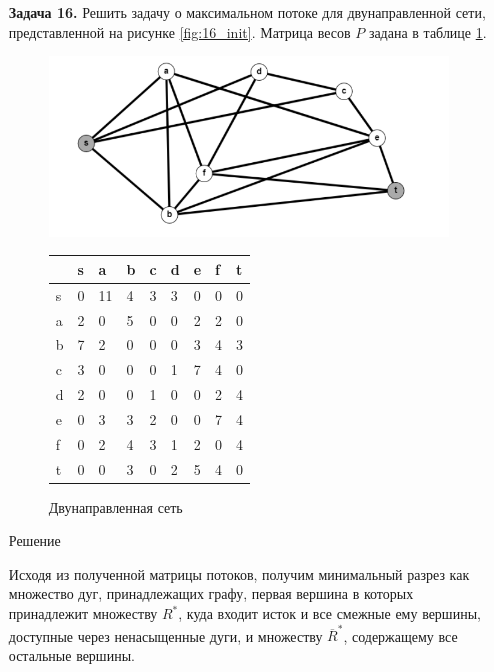 \documentclass{article}
\begin{document}
\clearpage%
\begin{enumerate} 
\item[\textbf{Задача 16.}]  Решить задачу о максимальном потоке для двунаправленной сети, представленной на рисунке \ref{fig:16_init}. Матрица весов $P$ задана в таблице \ref{tab:16_table}.
\begin{figure}[ht]
  \begin{minipage}[b]{.5\linewidth}
    \centering
    \includegraphics[width=\textwidth, center]{attachments/16/0.png}
    \caption{Двунаправленная сеть}
    \label{fig:16_init}
  \end{minipage}
  \hfill
  \begin{minipage}[b]{.45\linewidth}
    \centering
    \begin{tabular}{|l|l|l|l|l|l|l|l|l|}
    \hline
          & s & a & b & c & d & e & f & t \\ \hline
        s & 0 & 11 & 4 & 3 & 3 & 0 & 0 & 0 \\ \hline
        a & 2 & 0 & 5 & 0 & 0 & 2 & 2 & 0 \\ \hline
        b & 7 & 2 & 0 & 0 & 0 & 3 & 4 & 3 \\ \hline
        c & 3 & 0 & 0 & 0 & 1 & 7 & 4 & 0 \\ \hline
        d & 2 & 0 & 0 & 1 & 0 & 0 & 2 & 4 \\ \hline
        e & 0 & 3 & 3 & 2 & 0 & 0 & 7 & 4 \\ \hline
        f & 0 & 2 & 4 & 3 & 1 & 2 & 0 & 4 \\ \hline
        t & 0 & 0 & 3 & 0 & 2 & 5 & 4 & 0 \\ \hline
    \end{tabular}
    \label{tab:16_table}
  \end{minipage}
\end{figure}
\begin{center}
Решение 
\end{center}
Исходя из полученной матрицы потоков, получим минимальный разрез как множество дуг, принадлежащих графу, первая вершина в которых принадлежит множеству $R^*$, куда входит исток и все смежные ему  вершины, доступные через ненасыщенные дуги, и множеству $\overline{R}^*$, содержащему все остальные вершины.


\end{enumerate}
\end{document}
